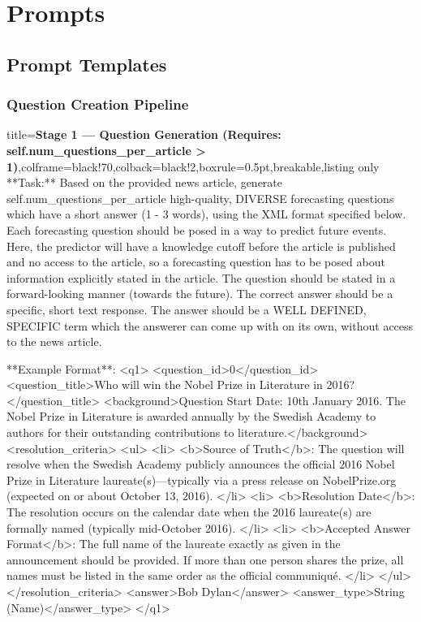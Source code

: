 \clearpage
\section{Prompts}
\label{sec:prompts}

\subsection{Prompt Templates}
\label{sec:prompt_templates}

\subsubsection{Question Creation Pipeline}

\begin{tcblisting}{title={\textbf{Stage 1 --- Question Generation (Requires:  self.num\_questions\_per\_article > 1)}},colframe=black!70,colback=black!2,boxrule=0.5pt,breakable,listing only}
**Task:** Based on the provided news article, generate {self.num_questions_per_article} high-quality, DIVERSE forecasting questions which have a short answer (1 - 3 words), using the XML format specified below.
Each forecasting question should be posed in a way to predict future events. Here, the predictor will have a knowledge cutoff before the article is published and no access to the article, so a forecasting question has to be posed about information explicitly stated in the article. The question should be stated in a forward-looking manner (towards the future).
The correct answer should be a specific, short text response. The answer should be a WELL DEFINED, SPECIFIC term which the answerer can come up with on its own, without access to the news article. 

**Example Format**:
<q1>
<question_id>0</question_id>
<question_title>Who will win the Nobel Prize in Literature in 2016?</question_title>
<background>Question Start Date: 10th January 2016. The Nobel Prize in Literature is awarded annually by the Swedish Academy to authors for their outstanding contributions to literature.</background>
<resolution_criteria> 
<ul>
    <li>
      <b>Source of Truth</b>: The question will resolve when the Swedish Academy publicly announces the official 2016 Nobel Prize in Literature laureate(s)---typically via a press release on NobelPrize.org (expected on or about October 13, 2016).  
    </li>
    <li>
      <b>Resolution Date</b>: The resolution occurs on the calendar date when the 2016 laureate(s) are formally named
      (typically mid-October 2016). 
    </li>
    <li>
      <b>Accepted Answer Format</b>: The full name of the laureate exactly as given in the announcement should be provided. If more than one person shares the prize, all names must be listed in the same order as the official communiqu{\'e}.
    </li>
</ul>
</resolution_criteria>
<answer>Bob Dylan</answer>
<answer_type>String (Name)</answer_type>
</q1>


\end{tcblisting}
